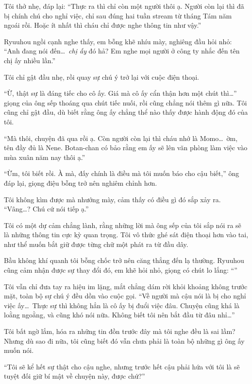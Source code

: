 \documentclass[../main.tex]{subfiles}
\begin{document}
Tôi thở nhẹ, đáp lại: ``Thực ra thì chỉ còn một người thôi ạ. Người còn lại thì đã bị chính chú cho nghỉ việc, chỉ sau đúng hai tuần stream từ tháng Tám năm ngoái rồi. Hoặc ít nhất thì cháu chỉ được nghe thông tin như vậy.''

Ryuuhou ngồi cạnh nghe thấy, em bỗng khẽ nhíu mày, nghiêng đầu hỏi nhỏ: ``Anh đang nói đến\dots\ \emph{chị ấy} đó hả? Em nghe mọi người ở công ty nhắc đến tên chị ấy nhiều lần.''

Tôi chỉ gật đầu nhẹ, rồi quay sự chú ý trở lại với cuộc điện thoại.

``Ừ, thật sự là đáng tiếc cho cô ấy. Giá mà cô ấy cẩn thận hơn một chút thì\dots'' giọng của ông sếp thoáng qua chút tiếc nuối, rồi cũng chẳng nói thêm gì nữa. Tôi cũng chỉ gật đầu, dù biết rằng ông ấy chẳng thể nào thấy được hành động đó của tôi.

``Mà thôi, chuyện đã qua rồi ạ. Còn người còn lại thì cháu nhớ là Momo\dots\ ờm, tên đầy đủ là Nene. Botan-chan có bảo rằng em ấy sẽ lên văn phòng làm việc vào mùa xuân năm nay thôi ạ.''

``Ừm, tôi biết rồi. À mà, đấy chính là điều mà tôi muốn báo cho cậu biết,'' ông đáp lại, giọng điệu bỗng trở nên nghiêm chỉnh hơn.

Tôi không kìm được mà nhướng mày, cảm thấy có điều gì đó sắp xảy ra. ``Vâng\dots? Chú cứ nói tiếp ạ.''

Tôi có một dự cảm chẳng lành, rằng những lời mà ông sếp của tôi sắp nói ra sẽ là những thông tin cực kỳ quan trọng. Tôi vô thức ghé sát điện thoại hơn vào tai, như thể muốn bắt giữ được từng chữ một phát ra từ đầu dây.

Bầu không khí quanh tôi bỗng chốc trở nên căng thẳng đến lạ thường. Ryuuhou cũng cảm nhận được sự thay đổi đó, em khẽ hỏi nhỏ, giọng có chút lo lắng: ``''

Tôi vẫn chỉ đưa tay ra hiệu im lặng, mắt chẳng dám rời khỏi khoảng không trước mặt, toàn bộ sự chú ý đều dồn vào cuộc gọi. ``Về người mà cậu nói là bị cho nghỉ việc ấy\dots\ Thực sự thì không hẳn là cô ấy bị đuổi việc đâu. Chuyện cũng khá là loằng ngoằng, và cũng khó nói nữa. Không biết tôi nên bắt đầu từ đâu nhỉ\dots''

Tôi bất ngờ lắm, hóa ra những tin đồn trước đây mà tôi nghe đều là sai lầm? Nhưng dù sao đi nữa, tôi cũng biết đó vẫn chưa phải là toàn bộ những gì ông ấy muốn nói.

``Tôi sẽ kể hết sự thật cho cậu nghe, nhưng trước hết cậu phải hứa với tôi là sẽ tuyệt đối giữ bí mật về chuyện này, được chứ?''
\end{document}
